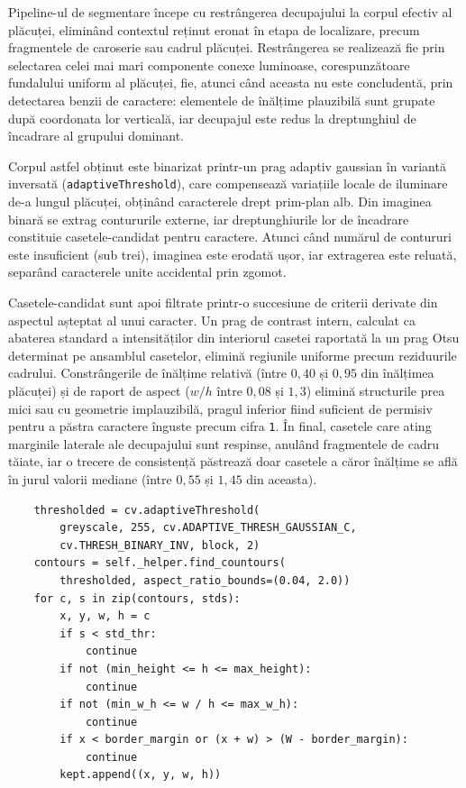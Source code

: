 Pipeline-ul de segmentare începe cu restrângerea decupajului la corpul efectiv al plăcuței, eliminând contextul reținut eronat în etapa de localizare, precum fragmentele de caroserie sau cadrul plăcuței. Restrângerea se realizează fie prin selectarea celei mai mari componente conexe luminoase, corespunzătoare fundalului uniform al plăcuței, fie, atunci când aceasta nu este concludentă, prin detectarea benzii de caractere: elementele de înălțime plauzibilă sunt grupate după coordonata lor verticală, iar decupajul este redus la dreptunghiul de încadrare al grupului dominant.

Corpul astfel obținut este binarizat printr-un prag adaptiv gaussian în variantă inversată (\texttt{adaptiveThreshold}), care compensează variațiile locale de iluminare de-a lungul plăcuței, obținând caracterele drept prim-plan alb. Din imaginea binară se extrag contururile externe, iar dreptunghiurile lor de încadrare constituie casetele-candidat pentru caractere. Atunci când numărul de contururi este insuficient (sub trei), imaginea este erodată ușor, iar extragerea este reluată, separând caracterele unite accidental prin zgomot.

Casetele-candidat sunt apoi filtrate printr-o succesiune de criterii derivate din aspectul așteptat al unui caracter. Un prag de contrast intern, calculat ca abaterea standard a intensităților din interiorul casetei raportată la un prag Otsu determinat pe ansamblul casetelor, elimină regiunile uniforme precum reziduurile cadrului. Constrângerile de înălțime relativă (între $0{,}40$ și $0{,}95$ din înălțimea plăcuței) și de raport de aspect ($w/h$ între $0{,}08$ și $1{,}3$) elimină structurile prea mici sau cu geometrie implauzibilă, pragul inferior fiind suficient de permisiv pentru a păstra caractere înguste precum cifra \texttt{1}. În final, casetele care ating marginile laterale ale decupajului sunt respinse, anulând fragmentele de cadru tăiate, iar o trecere de consistență păstrează doar casetele a căror înălțime se află în jurul valorii mediane (între $0{,}55$ și $1{,}45$ din aceasta).

\begin{verbatim}
    thresholded = cv.adaptiveThreshold(
        greyscale, 255, cv.ADAPTIVE_THRESH_GAUSSIAN_C,
        cv.THRESH_BINARY_INV, block, 2)
    contours = self._helper.find_countours(
        thresholded, aspect_ratio_bounds=(0.04, 2.0))
    for c, s in zip(contours, stds):
        x, y, w, h = c
        if s < std_thr:
            continue
        if not (min_height <= h <= max_height):
            continue
        if not (min_w_h <= w / h <= max_w_h):
            continue
        if x < border_margin or (x + w) > (W - border_margin):
            continue
        kept.append((x, y, w, h))
\end{verbatim}


